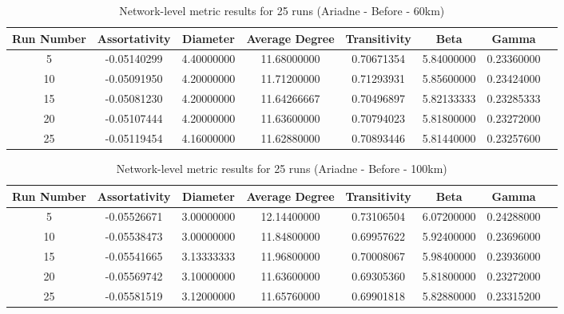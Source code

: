 \documentclass[12pt,a4paper]{thesis}
\begin{document}
\begin{appendices}
\begin{table}[H]
\centering
\caption{Network-level metric results for 25 runs (Ariadne - Before - 60km)}
\tiny
\begin{tabular}{|c|c|c|c|c|c|c|c|}
\hline Run Number & Assortativity & Diameter & Average Degree & Transitivity & Beta & Gamma \\ 
\hline	5	&	-0.05140299	&	4.40000000	&	11.68000000	&	0.70671354	&	5.84000000	&	0.23360000	\\
\hline	10	&	-0.05091950	&	4.20000000	&	11.71200000	&	0.71293931	&	5.85600000	&	0.23424000	\\
\hline	15	&	-0.05081230	&	4.20000000	&	11.64266667	&	0.70496897	&	5.82133333	&	0.23285333	\\
\hline	20	&	-0.05107444	&	4.20000000	&	11.63600000	&	0.70794023	&	5.81800000	&	0.23272000	\\
\hline	25	&	-0.05119454	&	4.16000000	&	11.62880000	&	0.70893446	&	5.81440000	&	0.23257600	\\ 
\hline 
\end{tabular}
\label{tab:ConvergeAriadneB60} 
\end{table}

\begin{table}[H]
\centering
\caption{Network-level metric results for 25 runs (Ariadne - Before - 100km)}
\tiny
\begin{tabular}{|c|c|c|c|c|c|c|c|}
\hline Run Number & Assortativity & Diameter & Average Degree & Transitivity & Beta & Gamma \\ 
\hline	5	&	-0.05526671	&	3.00000000	&	12.14400000	&	0.73106504	&	6.07200000	&	0.24288000	\\
\hline	10	&	-0.05538473	&	3.00000000	&	11.84800000	&	0.69957622	&	5.92400000	&	0.23696000	\\
\hline	15	&	-0.05541665	&	3.13333333	&	11.96800000	&	0.70008067	&	5.98400000	&	0.23936000	\\
\hline	20	&	-0.05569742	&	3.10000000	&	11.63600000	&	0.69305360	&	5.81800000	&	0.23272000	\\
\hline	25	&	-0.05581519	&	3.12000000	&	11.65760000	&	0.69901818	&	5.82880000	&	0.23315200	\\
\hline 
\end{tabular}
\label{tab:ConvergeAriadneB100} 
\end{table}


\end{appendices}
\end{document}
